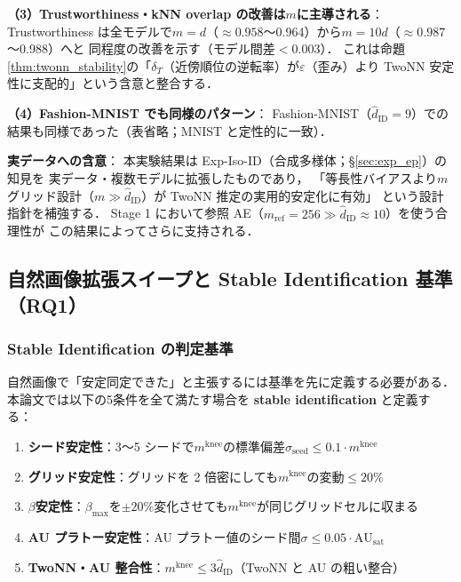 \documentclass[11pt,a4paper]{jsarticle}
\newcommand{\AUsat}{\mathrm{AU}_{\mathrm{sat}}}
\newcommand{\mknee}{m^{\mathrm{knee}}}
\begin{document}
\textbf{（3）Trustworthiness・kNN overlap の改善は$m$に主導される}：
Trustworthiness は全モデルで$m=d$（$\approx 0.958$〜0.964）から$m=10d$（$\approx 0.987$〜0.988）へと
同程度の改善を示す（モデル間差$< 0.003$）．
これは命題\ref{thm:twonn_stability}の「$\delta_T$（近傍順位の逆転率）が$\varepsilon$（歪み）より
TwoNN 安定性に支配的」という含意と整合する．

\textbf{（4）Fashion-MNIST でも同様のパターン}：
Fashion-MNIST（$\hat{d}_\mathrm{ID}=9$）での結果も同様であった（表省略；MNIST と定性的に一致）．

\textbf{実データへの含意}：
本実験結果は Exp-Iso-ID（合成多様体；§\ref{sec:exp_ep}）の知見を
実データ・複数モデルに拡張したものであり，
「等長性バイアスより$m$グリッド設計（$m \gg \hat{d}_\mathrm{ID}$）が TwoNN 推定の実用的安定化に有効」
という設計指針を補強する．
Stage 1 において参照 AE（$m_\mathrm{ref}=256 \gg \hat{d}_\mathrm{ID} \approx 10$）を使う合理性が
この結果によってさらに支持される．

\subsection{自然画像拡張スイープと Stable Identification 基準（RQ1）}\label{sec:exp_natimg_sweep}

\subsubsection*{Stable Identification の判定基準}\label{sec:natimg_stable_id}

自然画像で「安定同定できた」と主張するには基準を先に定義する必要がある．
本論文では以下の5条件を全て満たす場合を \textbf{stable identification} と定義する：

\begin{enumerate}
  \item \textbf{シード安定性}：3〜5 シードで$\mknee$の標準偏差$\sigma_\mathrm{seed} \leq 0.1 \cdot \mknee$
  \item \textbf{グリッド安定性}：グリッドを 2 倍密にしても$\mknee$の変動$\leq 20\%$
  \item \textbf{$\beta$安定性}：$\beta_{\max}$を$\pm 20\%$変化させても$\mknee$が同じグリッドセルに収まる
  \item \textbf{AU プラトー安定性}：AU プラトー値のシード間$\sigma \leq 0.05 \cdot \AUsat$
  \item \textbf{TwoNN・AU 整合性}：$\mknee \leq 3 \hat{d}_\mathrm{ID}$（TwoNN と AU の粗い整合）
\end{enumerate}
\end{document}
